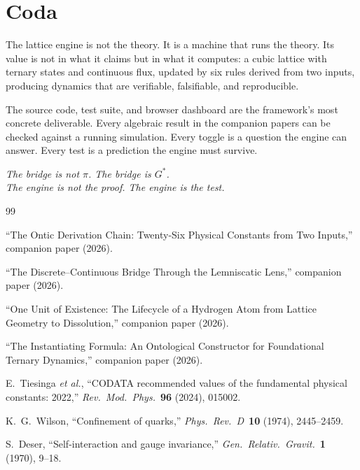 \documentclass[11pt,a4paper]{article}
\newcommand{\Gstar}{{G^{*}}}
\theoremstyle{compact}
\begin{document}
\section*{Coda}

The lattice engine is not the theory. It is a machine that runs the theory. Its value is not in what it claims but in what it computes: a cubic lattice with ternary states and continuous flux, updated by six rules derived from two inputs, producing dynamics that are verifiable, falsifiable, and reproducible.

The source code, test suite, and browser dashboard are the framework's most concrete deliverable. Every algebraic result in the companion papers can be checked against a running simulation. Every toggle is a question the engine can answer. Every test is a prediction the engine must survive.

\medskip

\begin{center}\itshape
The bridge is not $\pi$. The bridge is $\Gstar$.\\[3pt]
The engine is not the proof. The engine is the test.
\end{center}


\begin{thebibliography}{99}

 ``The Ontic Derivation Chain: Twenty-Six Physical Constants from Two Inputs,'' companion paper (2026).

 ``The Discrete--Continuous Bridge Through the Lemniscatic Lens,'' companion paper (2026).

 ``One Unit of Existence: The Lifecycle of a Hydrogen Atom from Lattice Geometry to Dissolution,'' companion paper (2026).

 ``The Instantiating Formula: An Ontological Constructor for Foundational Ternary Dynamics,'' companion paper (2026).

 E.~Tiesinga \textit{et al.}, ``CODATA recommended values of the fundamental physical constants: 2022,'' \textit{Rev.\ Mod.\ Phys.}\ \textbf{96} (2024), 015002.

 K.~G.~Wilson, ``Confinement of quarks,'' \textit{Phys.\ Rev.\ D}\ \textbf{10} (1974), 2445--2459.

 S.~Deser, ``Self-interaction and gauge invariance,'' \textit{Gen.\ Relativ.\ Gravit.}\ \textbf{1} (1970), 9--18.

\end{thebibliography}
\end{document}
